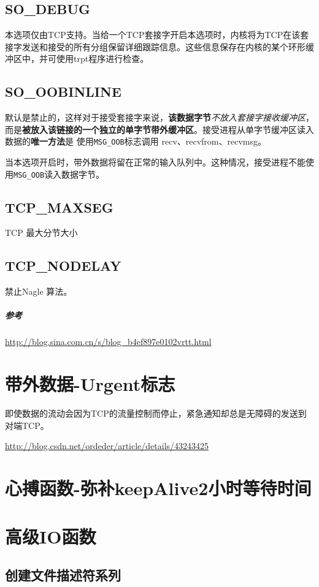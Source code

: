 \documentclass[UTF8,a4paper,12pt]{ctexbook}
\begin{document}
		\subsection{SO\_DEBUG}
			本选项仅由TCP支持。当给一个TCP套接字开启本选项时，内核将为TCP在该套接字发送和接受的所有分组保留详细跟踪信息。这些信息保存在内核的某个环形缓冲区中，并可使用trpt程序进行检查。
		
		\subsection{SO\_OOBINLINE}
			默认是禁止的，这样对于接受套接字来说，\textbf{该数据字节}\textit{不放入套接字接收缓冲区}，而是\textbf{被放入该链接的一个独立的单字节带外缓冲区}。接受进程从单字节缓冲区读入数据的\textbf{唯一方法}是  使用\verb|MSG_OOB|标志调用 recv、recvfrom、recvmsg。
			
			当本选项开启时，带外数据将留在正常的输入队列中。这种情况，接受进程不能使用\verb|MSG_OOB|读入数据字节。	
			
		\subsection{TCP\_MAXSEG}	
			TCP 最大分节大小
		
		\subsection{TCP\_NODELAY}
			禁止Nagle 算法。
			
		\subparagraph{参考}\url{http://blog.sina.com.cn/s/blog_b4ef897e0102vrtt.html}
	
	\section{带外数据-Urgent标志}
		即使数据的流动会因为TCP的流量控制而停止，紧急通知却总是无障碍的发送到对端TCP。
	
		\url{http://blog.csdn.net/ordeder/article/details/43243425}
	\section{心搏函数-弥补keepAlive2小时等待时间}	
			
	\section{高级IO函数}
		\subsection{创建文件描述符系列}
\end{document}
